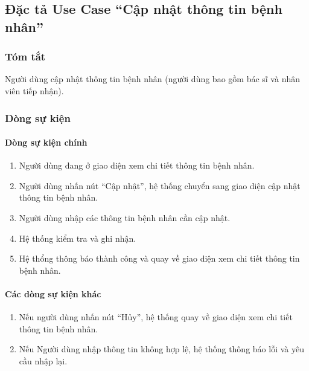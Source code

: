 \subsection{Đặc tả Use Case ``Cập nhật thông tin bệnh nhân''}

\subsubsection{Tóm tắt}
Người dùng cập nhật thông tin bệnh nhân (người dùng bao gồm bác sĩ và nhân viên tiếp nhận).

\subsubsection{Dòng sự kiện}
\paragraph{\textbf{Dòng sự kiện chính}}
\begin{enumerate}
  \item Người dùng đang ở giao diện xem chi tiết thông tin bệnh nhân.
  \item Người dùng nhấn nút ``Cập nhật'', hệ thống chuyển sang giao diện cập nhật thông tin bệnh nhân.
  \item Người dùng nhập các thông tin bệnh nhân cần cập nhật.
  \item Hệ thống kiểm tra và ghi nhận.
  \item Hệ thổng thông báo thành công và quay về giao diện xem chi tiết thông tin bệnh nhân.
\end{enumerate}

\paragraph{\textbf{Các dòng sự kiện khác}}
\begin{enumerate}
  \item Nếu người dùng nhấn nút ``Hủy'', hệ thống quay về giao diện xem chi tiết thông tin bệnh nhân.
  \item Nếu Người dùng nhập thông tin không hợp lệ, hệ thống thông báo lỗi và yêu cầu nhập lại.
\end{enumerate}

